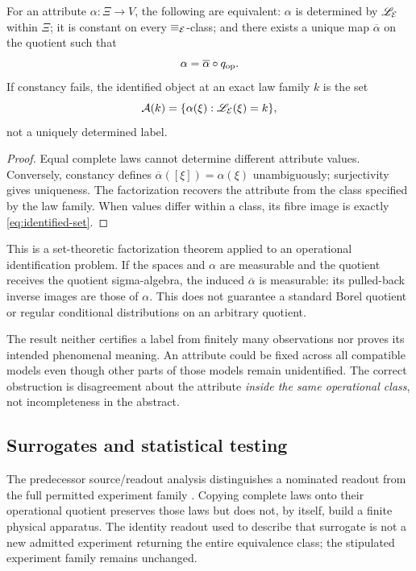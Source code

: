 \begin{theorem}\label{p2-27}
For an attribute \(\alpha:\Xi\to V\), the following are equivalent: \(\alpha\) is determined by \(\mathscr L_{\mathcal E}\) within \(\Xi\); it is constant on every \(\equiv_{\mathcal E}\)-class; and there exists a unique map \(\overline\alpha\) on the quotient such that
\begin{equation}\label{eq:attribute-factor}
 \alpha=\overline\alpha\circ q_{\mathrm{op}}.
\end{equation}
If constancy fails, the identified object at an exact law family \(k\) is the set
\begin{equation}\label{eq:identified-set}
 \mathcal A(k)=\{\alpha(\xi):\mathscr L_{\mathcal E}(\xi)=k\},
\end{equation}
not a uniquely determined label.
\end{theorem}
\begin{proof}
Equal complete laws cannot determine different attribute values. Conversely, constancy defines \(\overline\alpha([\xi])=\alpha(\xi)\) unambiguously; surjectivity gives uniqueness. The factorization recovers the attribute from the class specified by the law family. When values differ within a class, its fibre image is exactly \cref{eq:identified-set}.
\end{proof}
This is a set-theoretic factorization theorem applied to an operational identification problem. If the spaces and \(\alpha\) are measurable and the quotient receives the quotient sigma-algebra, the induced \(\overline\alpha\) is measurable: its pulled-back inverse images are those of \(\alpha\). This does not guarantee a standard Borel quotient or regular conditional distributions on an arbitrary quotient.

The result neither certifies a label from finitely many observations nor proves its intended phenomenal meaning. An attribute could be fixed across all compatible models even though other parts of those models remain unidentified. The correct obstruction is disagreement about the attribute \emph{inside the same operational class}, not incompleteness in the abstract.

\subsection{Surrogates and statistical testing}
The predecessor source/readout analysis distinguishes a nominated readout from the full permitted experiment family \cite{RodgersSealed2026}. Copying complete laws onto their operational quotient preserves those laws but does not, by itself, build a finite physical apparatus. The identity readout used to describe that surrogate is not a new admitted experiment returning the entire equivalence class; the stipulated experiment family remains unchanged.

